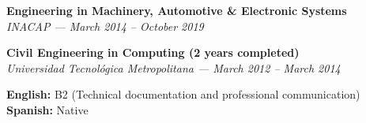 \documentclass[10pt,letterpaper]{article}
\begin{document}
\vspace{0.3cm}

\vspace{0.4cm}

\vspace{0.3cm}

\noindent \textbf{Engineering in Machinery, Automotive \& Electronic Systems} \\
\textit{INACAP — March 2014 – October 2019}

\vspace{0.2cm}

\noindent \textbf{Civil Engineering in Computing (2 years completed)} \\
\textit{Universidad Tecnológica Metropolitana — March 2012 – March 2014}

\vspace{0.4cm}


\vspace{0.3cm}

\noindent \textbf{English:} B2 (Technical documentation and professional communication) \\
\noindent \textbf{Spanish:} Native
\end{document}
